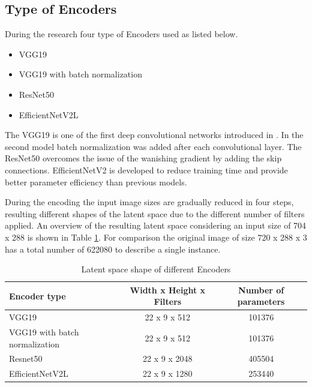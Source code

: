 \subsection{Type of Encoders}
During the research four type of Encoders used as listed below.

\begin{itemize}
    \item VGG19
    \item VGG19 with batch normalization
    \item ResNet50
    \item EfficientNetV2L
\end{itemize}

The VGG19 is one of the first deep convolutional networks introduced in \cite{simonyan_very_2015}.
In the second model batch normalization was added after each convolutional layer.
The ResNet50 \cite{he_deep_2015} overcomes the issue of the wanishing gradient
by adding the skip connections.
EfficientNetV2 \cite{tan_efficientnetv2_2021} is developed to reduce training time
and provide better parameter efficiency than previous models.

During the encoding the input image sizes are gradually reduced in four steps,
resulting different shapes of the latent space due to the different number of filters applied.
An overview of the resulting latent space considering an input size of 704 x 288
is shown in Table \ref{table:latent_space_shape}.
For comparison the original image of size 720 x 288 x 3 has a total number of 622080 to describe
a single instance.

\begin{table}[!ht]
    \centering
    \begin{tabular}{l c c}
        Encoder type                   & Width x Height x Filters & Number of parameters \\
        \hline
        VGG19                          & 22 x 9 x 512             & 101376               \\
        VGG19 with batch normalization & 22 x 9 x 512             & 101376               \\
        Resnet50                       & 22 x 9 x 2048            & 405504               \\
        EfficientNetV2L                & 22 x 9 x 1280            & 253440               \\
    \end{tabular}
    \caption{Latent space shape of different Encoders}
    \label{table:latent_space_shape}
\end{table}


